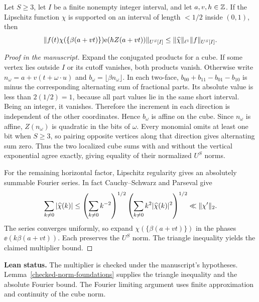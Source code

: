 \begin{lemma}\label{l:vertical-mode-multiplier}
\leanok
{}
Let $S\ge3$, let $I$ be a finite nonempty integer interval, and
let $a,v,h\in\mathbb Z$. If the Lipschitz function $\chi$ is supported on
an interval of length $<1/2$ inside $(0,1)$, then
\[
 \lVert f(t)\chi(\{\beta(a+vt)\})\mathrm e(hZ(a+vt))\rVert_{U^S[I]}
 \le\lVert\widehat\chi\rVert_{\ell^1}\lVert f\rVert_{U^S[I]} .
\]
\end{lemma}
\begin{proof}[Proof in the manuscript]
\leanok
Expand the conjugated products for a cube. If some
vertex lies outside $I$ or its cutoff vanishes, both products vanish.
Otherwise write $n_\omega=a+v(t+\omega\cdot u)$
and $b_\omega=\lfloor\beta n_\omega\rfloor$.
In each two-face,
$b_{00}+b_{11}-b_{01}-b_{10}$ is minus the corresponding
alternating sum of fractional parts. Its absolute value is
less than $2(1/2)=1$, because all part values lie in the
same short interval. Being an integer, it vanishes. Therefore
the increment in each direction is independent of the other
coordinates. Hence $b_\omega$ is affine on the cube.
Since $n_\omega$ is affine, $Z(n_\omega)$ is quadratic in the
bits of $\omega$. Every monomial omits at least one bit when $S\ge3$,
so pairing opposite vertices along that direction gives alternating
sum zero. Thus the two localized cube sums with and without the
vertical exponential agree exactly, giving equality of their
normalized $U^S$ norms.

For the remaining horizontal factor, Lipschitz regularity gives an
absolutely summable Fourier series. In fact Cauchy--Schwarz and
Parseval give
\[
 \sum_{k\ne0}|\widehat\chi(k)|
 \le\left(\sum_{k\ne0}k^{-2}\right)^{1/2}
    \left(\sum_{k\ne0}k^2|\widehat\chi(k)|^2\right)^{1/2}
 \ll\lVert\chi'\rVert_2.
\]
The series converges uniformly, so expand
$\chi(\{\beta(a+vt)\})$ in the phases $\ee(k\beta(a+vt))$.
Each preserves the $U^S$ norm. The triangle inequality yields the
claimed multiplier bound.
\end{proof}
\noindent\textbf{Lean status.} The multiplier is checked under the
manuscript's hypotheses. Lemma~\ref{checked-norm-foundations} supplies
the triangle inequality and the absolute Fourier bound. The Fourier
limiting argument uses finite approximation and continuity of the cube
norm.

